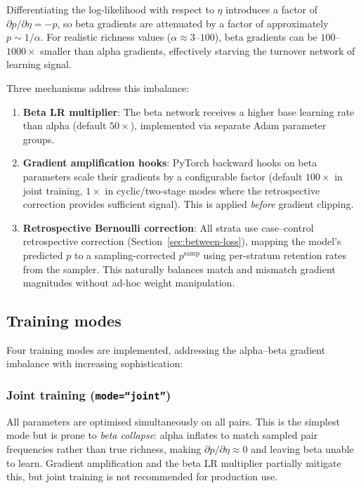 \documentclass{article}
\begin{document}
Differentiating the log-likelihood with respect to $\eta$ introduces a factor of $\partial p / \partial \eta = -p$, so beta gradients are attenuated by a factor of approximately $p \sim 1/\alpha$. For realistic richness values ($\alpha \approx 3$--$100$), beta gradients can be $100$--$1000\times$ smaller than alpha gradients, effectively starving the turnover network of learning signal.

Three mechanisms address this imbalance:

\begin{enumerate}
    \item \textbf{Beta LR multiplier}: The beta network receives a higher base learning rate than alpha (default $50\times$), implemented via separate Adam parameter groups.
    
    \item \textbf{Gradient amplification hooks}: PyTorch backward hooks on beta parameters scale their gradients by a configurable factor (default $100\times$ in joint training, $1\times$ in cyclic/two-stage modes where the retrospective correction provides sufficient signal). This is applied \textit{before} gradient clipping.
    
    \item \textbf{Retrospective Bernoulli correction}: All strata use case--control retrospective correction (Section~\ref{sec:between-loss}), mapping the model's predicted $p$ to a sampling-corrected $p^{\text{samp}}$ using per-stratum retention rates from the sampler. This naturally balances match and mismatch gradient magnitudes without ad-hoc weight manipulation.
\end{enumerate}

\subsection{Training modes}
\label{sec:training-modes}

Four training modes are implemented, addressing the alpha--beta gradient imbalance with increasing sophistication:

\subsubsection{Joint training (\texttt{mode=``joint''})}

All parameters are optimised simultaneously on all pairs. This is the simplest mode but is prone to \textit{beta collapse}: alpha inflates to match sampled pair frequencies rather than true richness, making $\partial p / \partial \eta \approx 0$ and leaving beta unable to learn. Gradient amplification and the beta LR multiplier partially mitigate this, but joint training is not recommended for production use.
\end{document}
